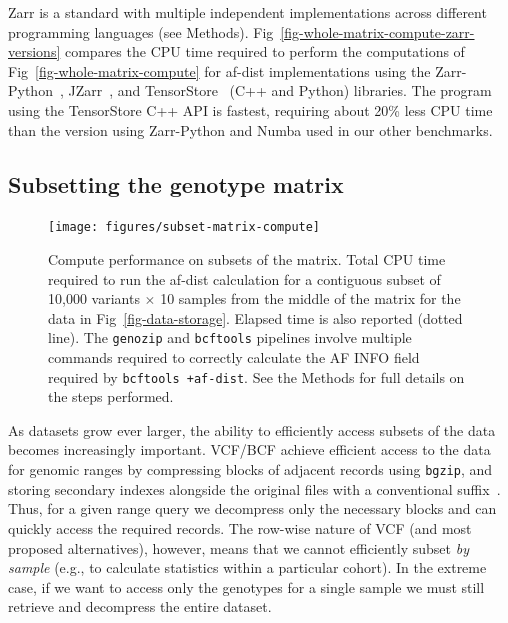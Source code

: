 \documentclass[a4paper,num-refs]{oup-contemporary}
\begin{document}
Zarr is a standard with multiple 
independent implementations across different programming languages
(see Methods). Fig~\ref{fig-whole-matrix-compute-zarr-versions}
compares the CPU time required to perform the computations
of Fig~\ref{fig-whole-matrix-compute}
for af-dist implementations using the Zarr-Python~\cite{zarrpython},
JZarr~\cite{jzarr},
and TensorStore~\citep{tensorstore} (C++ and Python) libraries.
The program using the TensorStore C++ API is fastest, requiring
about 20\% less CPU time than the version using Zarr-Python and Numba
used in our other benchmarks.


\subsection{Subsetting the genotype matrix}
\begin{figure}[t]
\texttt{[image: figures/subset-matrix-compute]}
\caption{Compute performance on subsets of the matrix.
Total CPU time required to run the af-dist calculation for
a contiguous subset of 10,000 variants $\times$ 10 samples
from the middle of the matrix
for the data in Fig~\ref{fig-data-storage}.
Elapsed time is also reported (dotted line).
The \texttt{genozip} and \texttt{bcftools} pipelines involve
multiple commands required to correctly calculate the AF INFO field
required by \texttt{bcftools +af-dist}. See the Methods for full details
on the steps performed.
\label{fig-subset-matrix-compute}}
\end{figure}

As datasets grow ever larger, the ability to efficiently access subsets
of the data becomes increasingly important. VCF/BCF achieve efficient
access to the data for genomic ranges
by compressing blocks of adjacent records using \texttt{bgzip},
and storing secondary indexes alongside the original
files with a conventional suffix~\citep{li2011tabix}.
Thus, for a given range query we
decompress only the necessary blocks and can quickly access
the required records.
The row-wise nature of VCF (and most proposed alternatives), however, means
that we cannot efficiently subset \emph{by sample}
(e.g., to calculate statistics within a particular cohort). In the extreme
case, if we want to access only the genotypes for a single sample
we must still retrieve and decompress the entire dataset.
\end{document}
